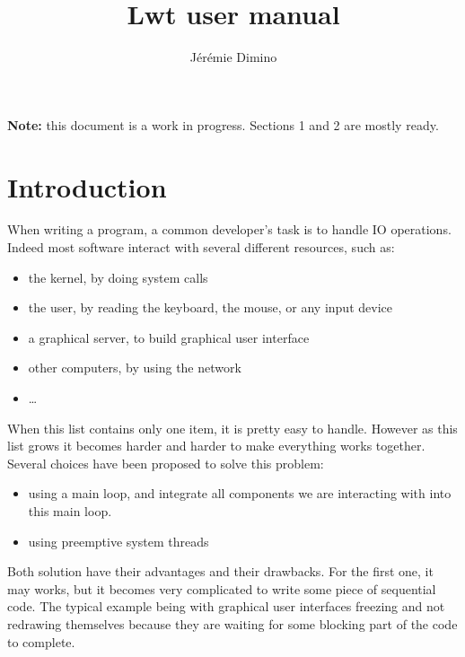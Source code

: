 \documentclass{article}
\title{Lwt user manual}
\author{Jérémie Dimino}
\begin{document}
\maketitle

\textbf{Note:} this document is a work in progress. Sections 1 and 2
are mostly ready.


\setcounter{tocdepth}{3}
\tableofcontents

\section{Introduction}

When writing a program, a common developer's task is to handle IO
operations. Indeed most software interact with several different
resources, such as:

\begin{itemize}
\item the kernel, by doing system calls
\item the user, by reading the keyboard, the mouse, or any input
  device
\item a graphical server, to build graphical user interface
\item other computers, by using the network
\item \dots
\end{itemize}

When this list contains only one item, it is pretty easy to
handle. However as this list grows it becomes harder and harder to
make everything works together. Several choices have been proposed to
solve this problem:

\begin{itemize}
\item using a main loop, and integrate all components we are
  interacting with into this main loop.
\item using preemptive system threads
\end{itemize}

Both solution have their advantages and their drawbacks. For the first
one, it may works, but it becomes very complicated to write some piece of
sequential code. The typical example being with graphical user
interfaces freezing and not redrawing themselves because they are
waiting for some blocking part of the code to complete.
\end{document}

